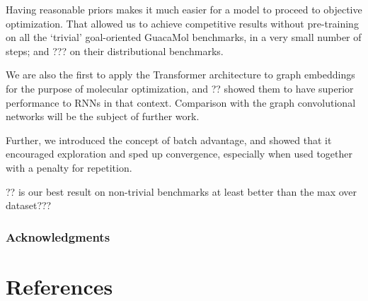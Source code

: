 \documentclass{article}
\begin{document}
Having reasonable priors makes it much easier for a model to proceed to objective optimization. That allowed us to achieve competitive results without pre-training on all the `trivial' goal-oriented GuacaMol benchmarks, in a very small number of steps;  and ??? on their distributional benchmarks.

We are also the first to apply the Transformer architecture to graph embeddings for the purpose of molecular optimization, and ?? showed them to have superior performance to RNNs in that context. Comparison with the graph convolutional networks will be the subject of further work.

Further, we introduced the concept of batch advantage, and showed that it encouraged exploration and sped up convergence, especially when used together with a penalty for repetition.

?? is our best result on non-trivial benchmarks at least better than the max over dataset???


\subsubsection*{Acknowledgments}

\section*{References}
\medskip

\small
 

\end{document}
